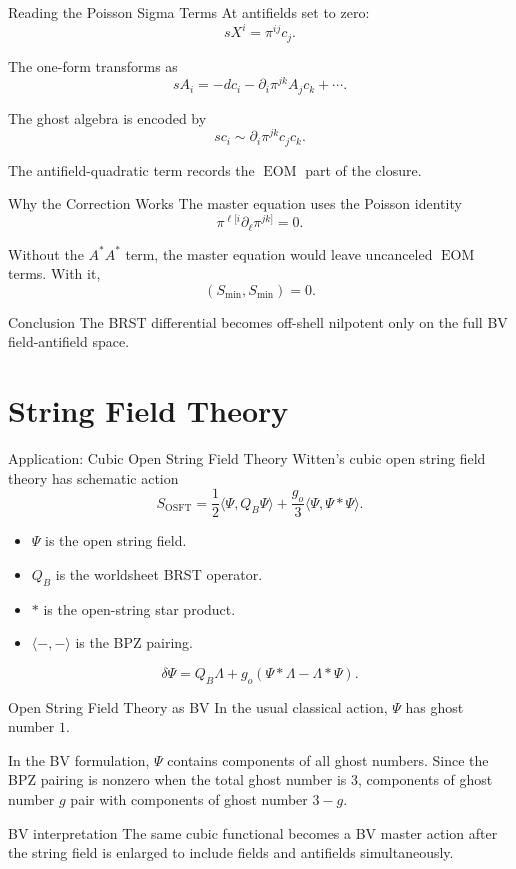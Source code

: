 \documentclass[aspectratio=169,professionalfonts]{beamer}
\newcommand{\EOM}{\ensuremath{\operatorname{EOM}}}
\begin{document}
\begin{frame}{Reading the Poisson Sigma Terms}
  At antifields set to zero:
  \[
    sX^i=\pi^{ij}c_j .
  \]

  The one-form transforms as
  \[
    sA_i=-dc_i-\partial_i\pi^{jk}A_jc_k+\cdots .
  \]

  The ghost algebra is encoded by
  \[
    sc_i\sim \partial_i\pi^{jk}c_jc_k .
  \]

  The antifield-quadratic term records the \EOM{} part of the closure.
\end{frame}

\begin{frame}{Why the Correction Works}
  The master equation uses the Poisson identity
  \[
    \pi^{\ell[i}\partial_\ell\pi^{jk]}=0 .
  \]

  Without the $A^*A^*$ term, the master equation would leave uncanceled
  \EOM{} terms. With it,
  \[
    (S_{\min},S_{\min})=0 .
  \]

  \begin{exampleblock}{Conclusion}
    The BRST differential becomes off-shell nilpotent only on the full BV
    field-antifield space.
  \end{exampleblock}
\end{frame}

\section{String Field Theory}

\begin{frame}{Application: Cubic Open String Field Theory}
  Witten's cubic open string field theory has schematic action
  \[
    S_{\mathrm{OSFT}}
    =\frac12\langle \Psi,Q_B\Psi\rangle
    +\frac{g_o}{3}\langle \Psi,\Psi*\Psi\rangle .
  \]

  \begin{itemize}
    \item $\Psi$ is the open string field.
    \item $Q_B$ is the worldsheet BRST operator.
    \item $*$ is the open-string star product.
    \item $\langle-,-\rangle$ is the BPZ pairing.
  \end{itemize}

  \[
    \delta\Psi
    =Q_B\Lambda+g_o(\Psi*\Lambda-\Lambda*\Psi).
  \]
\end{frame}

\begin{frame}{Open String Field Theory as BV}
  In the usual classical action, $\Psi$ has ghost number $1$.

  In the BV formulation, $\Psi$ contains components of all ghost numbers.
  Since the BPZ pairing is nonzero when the total ghost number is $3$,
  components of ghost number $g$ pair with components of ghost number $3-g$.

  \begin{block}{BV interpretation}
    The same cubic functional becomes a BV master action after the string
    field is enlarged to include fields and antifields simultaneously.
  \end{block}
\end{frame}
\end{document}
